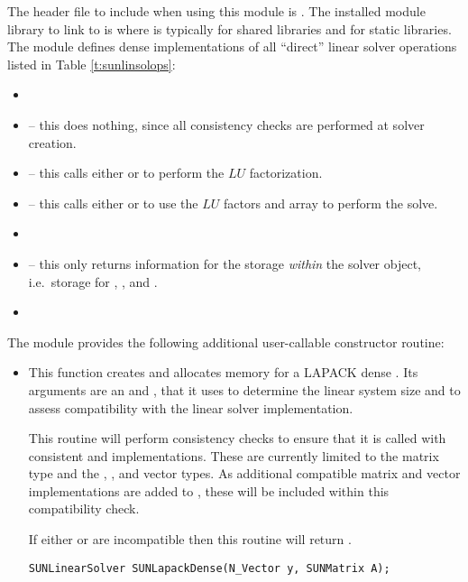 \noindent The header file to include when using this module 
is . The installed module
library to link to is
where  is typically  for shared libraries and
 for static libraries. \\


\noindent The {\sunlinsollapdense} module defines dense implementations of all
``direct'' linear solver operations listed in
Table \ref{t:sunlinsolops}:
\begin{itemize}
\item {}
\item {} -- this does nothing, since all
  consistency checks are performed at solver creation.
\item {} -- this calls either
   or  to perform the $LU$ factorization.
\item {} -- this calls either
   or  to use the $LU$ factors and 
  array to perform the solve.
\item {}
\item {} -- this only returns information for
  the storage \emph{within} the solver object, i.e.~storage
  for , , and .
\item {}
\end{itemize}
The module {\sunlinsollapdense} provides the following additional
user-callable constructor routine: 
\begin{itemize}


\item {}

  This function creates and allocates memory for a LAPACK dense
  .  Its arguments are an {\nvector} and
  {\sunmatrix}, that it uses to determine the linear system size and
  to assess compatibility with the linear solver implementation.

  This routine will perform consistency checks to ensure that it is
  called with consistent {\nvector} and {\sunmatrix} implementations.
  These are currently limited to the {\sunmatdense} matrix type and
  the {\nvecs}, {\nvecopenmp}, and {\nvecpthreads} vector types.  As
  additional compatible matrix and vector implementations are added to
  {\sundials}, these will be included within this compatibility check.

  If either  or  are incompatible then this routine will
  return .

  \verb|SUNLinearSolver SUNLapackDense(N_Vector y, SUNMatrix A);|

\end{itemize}
